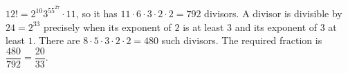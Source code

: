 $12!=2^{10}3^55^27\cdot11$, so it has $11\cdot6\cdot3\cdot2\cdot2=792$ divisors. A divisor is divisible by $24=2^33$ precisely when its exponent of $2$ is at least $3$ and its exponent of $3$ at least $1$. There are $8\cdot5\cdot3\cdot2\cdot2=480$ such divisors. The required fraction is $\boxed{\dfrac{480}{792}=\dfrac{20}{33}}$.
